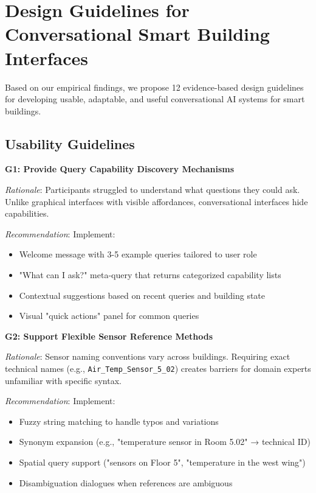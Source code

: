 \documentclass[acmlarge]{acmart}
\begin{document}
\section{Design Guidelines for Conversational Smart Building Interfaces}

Based on our empirical findings, we propose 12 evidence-based design guidelines for developing usable, adaptable, and useful conversational AI systems for smart buildings.

\subsection{Usability Guidelines}

\textbf{G1: Provide Query Capability Discovery Mechanisms}

\textit{Rationale}: Participants struggled to understand what questions they could ask. Unlike graphical interfaces with visible affordances, conversational interfaces hide capabilities.

\textit{Recommendation}: Implement:
\begin{itemize}
    \item Welcome message with 3-5 example queries tailored to user role
    \item "What can I ask?" meta-query that returns categorized capability lists
    \item Contextual suggestions based on recent queries and building state
    \item Visual "quick actions" panel for common queries
\end{itemize}

\textbf{G2: Support Flexible Sensor Reference Methods}

\textit{Rationale}: Sensor naming conventions vary across buildings. Requiring exact technical names (e.g., \texttt{Air\_Temp\_Sensor\_5\_02}) creates barriers for domain experts unfamiliar with specific syntax.

\textit{Recommendation}: Implement:
\begin{itemize}
    \item Fuzzy string matching to handle typos and variations
    \item Synonym expansion (e.g., "temperature sensor in Room 5.02" → technical ID)
    \item Spatial query support ("sensors on Floor 5", "temperature in the west wing")
    \item Disambiguation dialogues when references are ambiguous
\end{itemize}
\end{document}
